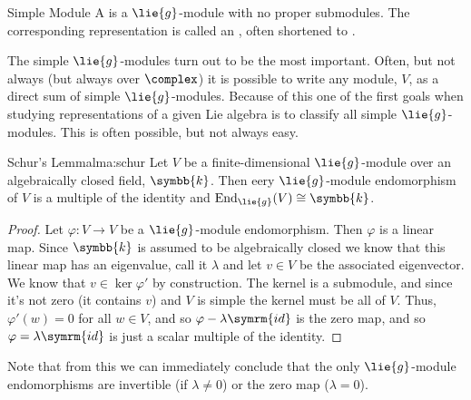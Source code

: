 \documentclass[fleqn]{NotesClass}
\renewcommand{\field}{\symbb{k}}
\newcommand{\isomorphic}{\cong}
\newcommand{\id}{\symrm{id}}
\DeclareMathOperator{\End}{End}
\begin{document}
    \begin{dfn}{Simple Module}{}
        A  is a \(\lie{g}\)-module with no proper submodules.
        The corresponding representation is called an , often shortened to .
    \end{dfn}
    
    The simple \(\lie{g}\)-modules turn out to be the most important.
    Often, but not always (but always over \(\complex\)) it is possible to write any module, \(V\), as a direct sum of simple \(\lie{g}\)-modules.
    Because of this one of the first goals when studying representations of a given Lie algebra is to classify all simple \(\lie{g}\)-modules.
    This is often possible, but not always easy.
    
    \begin{lma}{Schur's Lemma}{lma:schur}
        Let \(V\) be a finite-dimensional \(\lie{g}\)-module over an algebraically closed field, \(\field\).
        Then eery \(\lie{g}\)-module endomorphism of \(V\) is a multiple of the identity and \(\End_{\lie{g}}(V) \isomorphic \field\).
        \begin{proof}
            Let \(\varphi \colon V \to V\) be a \(\lie{g}\)-module endomorphism.
            Then \(\varphi\) is a linear map.
            Since \(\field\) is assumed to be algebraically closed we know that this linear map has an eigenvalue, call it \(\lambda\) and let \(v \in V\) be the associated eigenvector.
            We know that \(v \in \ker \varphi'\) by construction.
            The kernel is a submodule, and since it's not zero (it contains \(v\)) and \(V\) is simple the kernel must be all of \(V\).
            Thus, \(\varphi'(w) = 0\) for all \(w \in V\), and so \(\varphi - \lambda \id\) is the zero map, and so \(\varphi = \lambda \id\) is just a scalar multiple of the identity.
        \end{proof}
    \end{lma}
    
    Note that from this we can immediately conclude that the only \(\lie{g}\)-module endomorphisms are invertible (if \(\lambda \ne 0\)) or the zero map (\(\lambda = 0\)).
    
\end{document}
